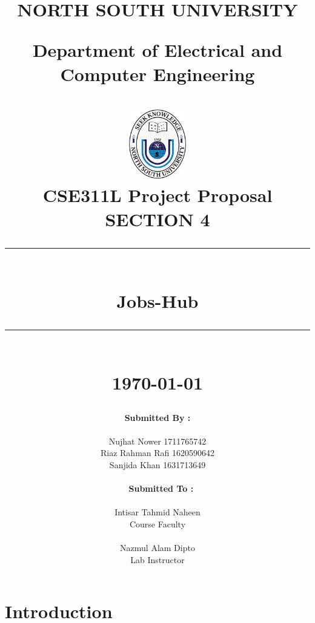 \documentclass[11pt]{report}
\newcommand{\HRule}[1]{\rule{\linewidth}{#1}}
\begin{document}
\date{}


\title{ \normalsize NORTH SOUTH UNIVERSITY
		
		Department of Electrical and Computer Engineering\\
		\\ [1.0cm]
		\includegraphics[width=25mm]{img/unnamed.png}\\[.5cm]
		CSE311L Project Proposal\\
		SECTION 4\\
		\HRule{2pt} \\
		\LARGE \textbf{Jobs-Hub} %
		\HRule{2pt} \\ [0.5cm]
		\normalsize \today \vspace*{5\baselineskip}}
		
\date{}

	    
	
\author{
\textbf{ Submitted By :} \\\\
		Nujhat Nower 1711765742  \\
        Riaz Rahman Rafi 1620590642  \\
        Sanjida Khan 1631713649 \\\\\
\textbf{ Submitted To :} \\\\

    Intisar Tahmid Naheen \\
    Course Faculty\\\\
    
    Nazmul Alam Dipto\\
    Lab Instructor}
		 
\maketitle


\section*{Introduction}
\end{document}
